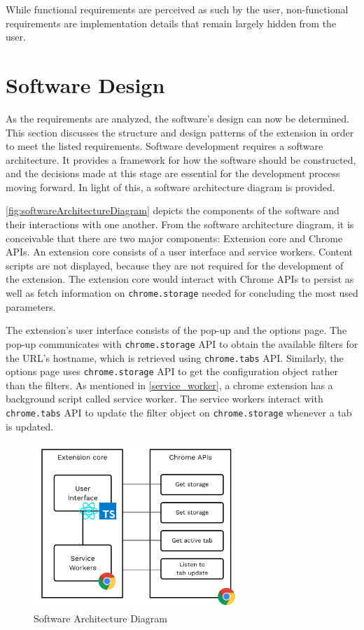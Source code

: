 While functional requirements are perceived as such by the user, non-functional requirements are implementation details that remain largely hidden from the user.

\section{Software Design}
As the requirements are analyzed, the software's design can now be determined. This section discusses the structure and design patterns of the extension in order to meet the listed requirements. Software development requires a software architecture. It provides a framework for how the software should be constructed, and the decisions made at this stage are essential for the development process moving forward. In light of this, a software architecture diagram is provided.

\autoref{fig:softwareArchitectureDiagram} depicts the components of the software and their interactions with one another. From the software architecture diagram, it is conceivable that there are two major components: Extension core and Chrome APIs. An extension core consists of a user interface and service workers. Content scripts are not displayed, because they are not required for the development of the extension. The extension core would interact with Chrome APIs to persist as well as fetch information on \texttt{chrome.storage} needed for concluding the most used parameters.

The extension's user interface consists of the pop-up and the options page. The pop-up communicates with \texttt{chrome.storage} API to obtain the available filters for the URL's hostname, which is retrieved using \texttt{chrome.tabs} API. Similarly, the options page uses \texttt{chrome.storage} API to get the configuration object rather than the filters. As mentioned in \autoref{service_worker}, a chrome extension has a background script called service worker. The service workers interact with \texttt{chrome.tabs} API to update the filter object on \texttt{chrome.storage} whenever a tab is updated.

\begin{figure}
  \centering
  \includegraphics[width=0.7\textwidth]{assets/software_architecture_diagram.png}
  \caption{Software Architecture Diagram}
  \label{fig:softwareArchitectureDiagram}
\end{figure}


